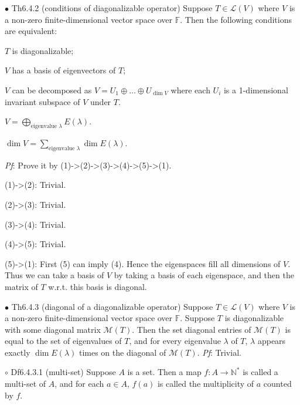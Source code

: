 \documentclass{article}
\begin{document}
\begin{Th}{$\bullet$ Th6.4.2 (conditions of diagonalizable operator)}
    Suppose $T\in\mathcal{L}(V)$ where $V$ is a non-zero finite-dimensional vector space over $\mathbb{F}$. Then the following conditions are equivalent:
    \begin{compactenum}
        \item $T$ is diagonalizable;
        \item $V$ has a basis of eigenvectors of $T$;
        \item $V$ can be decomposed as $V = U_1\oplus \dots \oplus U_{\dim V}$ where each $U_i$ is a 1-dimensional invariant subspace of $V$ under $T$.
        \item $V = \bigoplus_{\text{eigenvalue }\lambda} E(\lambda)$.
        \item $\dim V = \sum_{\text{eigenvalue }\lambda} \dim E(\lambda)$.
    \end{compactenum}
    \tcblower
    \textit{Pf}: Prove it by (1)->(2)->(3)->(4)->(5)->(1).
    \begin{compactitem}
        \item (1)->(2): Trivial.
        \item (2)->(3): Trivial.
        \item (3)->(4): Trivial.
        \item (4)->(5): Trivial.
        \item (5)->(1): First (5) can imply (4). Hence the eigenspaces fill all dimensions of $V$. Thus we can take a basis of $V$ by taking a basis of each eigenspace, and then the matrix of $T$ w.r.t. this basis is diagonal.
    \end{compactitem}
\end{Th}

\begin{Th}{$\bullet$ Th6.4.3 (diagonal of a diagonalizable operator)}
    Suppose $T\in\mathcal{L}(V)$ where $V$ is a non-zero finite-dimensional vector space over $\mathbb{F}$. Suppose $T$ is diagonalizable with some diagonal matrix $\mathcal{M}(T)$. Then the set diagonal entries of $\mathcal{M}(T)$ is equal to the set of eigenvalues of $T$, and for every eigenvalue $\lambda$ of $T$, $\lambda$ appears exactly $\dim E(\lambda)$ times on the diagonal of $\mathcal{M}(T)$.
    \tcblower
    \textit{Pf}: Trivial.
\end{Th}

\begin{Df}{$\circ$ Df6.4.3.1 (multi-set)}
    Suppose $A$ is a set. Then a map $f: A\to\mathbb{N}^\ast$ is called a multi-set of $A$, and for each $a\in A$, $f(a)$ is called the multiplicity of $a$ counted by $f$.
\end{Df}
\end{document}
